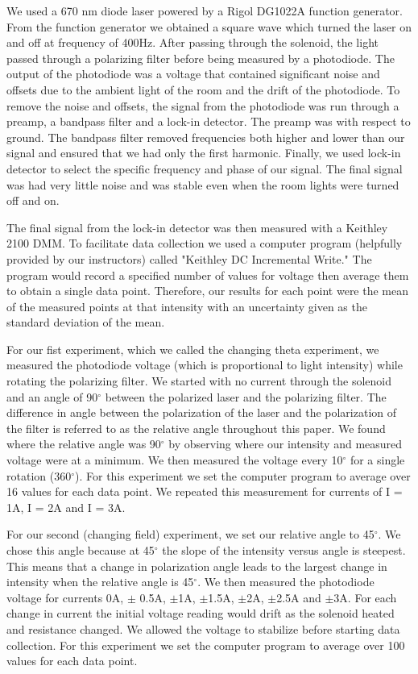 \documentclass[prb,preprint]{revtex4-1}
\begin{document}
We used a 670 nm diode laser powered by a Rigol DG1022A function generator. From the function generator we obtained a square wave which turned the laser on and off at frequency of 400Hz. After passing through the solenoid, the light passed through a polarizing filter before being measured by a photodiode. The output of the photodiode was a voltage that contained significant noise and offsets due to the ambient light of the room and the drift of the photodiode.  To remove the noise and offsets, the signal from the photodiode was run through a preamp, a bandpass filter and a lock-in detector. The preamp was with respect to ground. The bandpass filter removed frequencies both higher and lower than our signal and ensured that we had only the first harmonic. Finally, we used lock-in detector to select the specific frequency and phase of our signal. The final signal was had very little noise and was stable even when the room lights were turned off and on.

The final signal from the lock-in detector was then measured with a Keithley 2100 DMM. To facilitate data collection we used a computer program (helpfully provided by our instructors) called "Keithley DC Incremental Write." The program would record a specified number of values for voltage then average them to obtain a single data point. Therefore, our results for each point were the mean of the measured points at that intensity with an uncertainty given as the standard deviation of the mean. 

For our fist experiment, which we called the changing theta experiment, we measured the photodiode voltage (which is proportional to light intensity) while rotating the polarizing filter. We started with no current through the solenoid and an angle of 90$^{\circ}$ between the polarized laser and the polarizing filter. The difference in angle between the polarization of the laser and the polarization of the filter is referred to as the relative angle throughout this paper. We found where the relative angle was 90$^{\circ}$ by observing where our intensity and measured voltage were at a minimum. We then measured the voltage every 10$^{\circ}$ for a single rotation (360$^{\circ}$). For this experiment we set the computer program to average over 16 values for each data point. We repeated this measurement for currents of I = 1A, I = 2A and I = 3A. 

For our second (changing field) experiment, we set our relative angle to 45$^{\circ}$. We chose this angle because at 45$^{\circ}$ the slope of the intensity versus angle is steepest. This means that a change in polarization angle leads to the largest change in intensity when the relative angle is 45$^{\circ}$. We then measured the photodiode voltage for currents 0A, $\pm$ 0.5A, $\pm$1A, $\pm$1.5A, $\pm$2A, $\pm$2.5A and $\pm$3A. For each change in current the initial voltage reading would drift as the solenoid heated and resistance changed. We allowed the voltage to stabilize before starting data collection. For this experiment we set the computer program to average over 100 values for each data point.
\end{document}
